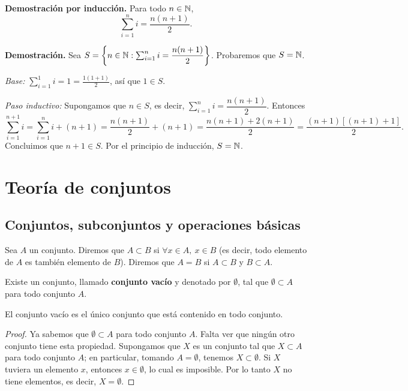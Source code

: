 \documentclass[12pt,a4paper]{book}
\begin{document}
    \begin{ejemplo}
        \textbf{Demostración por inducción.}
        Para todo $n\in\mathbb{N}$,
        \begin{equation*}
            \sum_{i=1}^n i = \frac{n(n+1)}{2}.
        \end{equation*}

        \textbf{Demostración.} Sea $S = \left\{n\in\mathbb{N} : \sum_{i=1}^n i = \dfrac{n(n+1)}{2}\right\}$. Probaremos que $S=\mathbb{N}$.

        \emph{Base:} $\displaystyle\sum_{i=1}^1 i = 1 = \frac{1(1+1)}{2}$, así que $1\in S$.

        \emph{Paso inductivo:} Supongamos que $n\in S$, es decir, $\sum_{i=1}^n i = \dfrac{n(n+1)}{2}$. Entonces
        \begin{equation*}
            \sum_{i=1}^{n+1} i = \sum_{i=1}^n i + (n+1) = \frac{n(n+1)}{2}+(n+1) = \frac{n(n+1)+2(n+1)}{2} = \frac{(n+1)[(n+1)+1]}{2}.
        \end{equation*}
        Concluimos que $n+1\in S$. Por el principio de inducción, $S=\mathbb{N}$.
    \end{ejemplo}

    \chapter{Teoría de conjuntos}

    \section{Conjuntos, subconjuntos y operaciones básicas}

    Sea $A$ un conjunto. Diremos que $A \subset B$ si $\forall x\in A,\ x\in B$ (es decir, todo elemento de $A$ es también elemento de $B$). Diremos que $A=B$ si $A\subset B$ y $B\subset A$.

    \begin{definicion}
        Existe un conjunto, llamado \textbf{conjunto vacío} y denotado por $\emptyset$, tal que $\emptyset \subset A$ para todo conjunto $A$.
    \end{definicion}

    \begin{proposicion}
        El conjunto vacío es el único conjunto que está contenido en todo conjunto.
    \end{proposicion}

    \begin{proof}
        Ya sabemos que $\emptyset \subset A$ para todo conjunto $A$. Falta ver que ningún otro conjunto tiene esta propiedad. Supongamos que $X$ es un conjunto tal que $X\subset A$ para todo conjunto $A$; en particular, tomando $A=\emptyset$, tenemos $X\subset\emptyset$. Si $X$ tuviera un elemento $x$, entonces $x\in\emptyset$, lo cual es imposible. Por lo tanto $X$ no tiene elementos, es decir, $X=\emptyset$.
    \end{proof}
\end{document}

